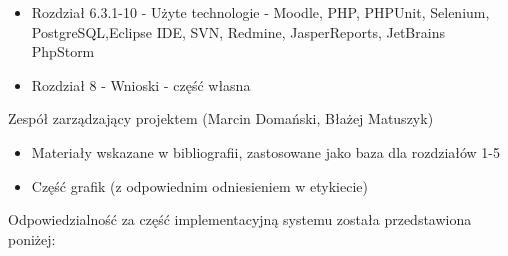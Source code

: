 \begin{description}
\begin{itemize}
\item Rozdział 6.3.1-10 - Użyte technologie - Moodle, PHP, PHPUnit, Selenium, PostgreSQL,Eclipse IDE, SVN, Redmine, JasperReports, JetBrains PhpStorm
\item Rozdział 8 - Wnioski - część własna
\end{itemize}
\noindent

\item Zespół zarządzający projektem (Marcin Domański, Błażej Matuszyk)

\begin{itemize}
\item Materiały wskazane w bibliografii\cite{Redmine:ProjDocs}, zastosowane jako baza dla rozdziałów 1-5
\item Część grafik (z odpowiednim odniesieniem w etykiecie)
\end{itemize}
\noindent

\end{description}
\noindent

Odpowiedzialność za część implementacyjną systemu została przedstawiona poniżej:

